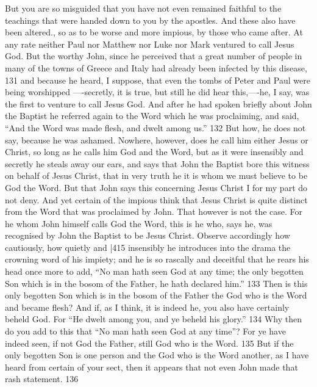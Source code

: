 But you are so misguided that you have not even remained faithful to the teachings that were handed down to you by the apostles. And these also have been altered., so as to be worse and more impious, by those who came after. At any rate neither Paul nor Matthew nor Luke nor Mark ventured to call Jesus God. But the worthy John, since he perceived that a great number of people in many of the towns of Greece and Italy had already been infected by this disease, 131 and because he heard, I suppose, that even the tombs of Peter and Paul were being worshipped
----secretly, it is true, but still he did hear this,----he, I say, was the first to venture to call Jesus God. And after he had spoken briefly about John the Baptist he referred again to the Word which he was proclaiming, and said, ``And the Word was made flesh, and dwelt among us.''
132 But how, he does not say, because he was ashamed. Nowhere, however, does he call him either Jesus or Christ, so long as he calls him God and the Word, but as it were insensibly and secretly he steals away our ears, and says that John the Baptist bore this witness on behalf of Jesus Christ, that in very truth he it is whom we must believe to be God the Word. But that John says this concerning Jesus Christ I for my part do not deny. And yet certain of the impious think that Jesus Christ is quite distinct from the Word that was proclaimed by John. That however is not the case. For he whom John himself calls God the Word, this is he who, says he, was recognised by John the Baptist to be Jesus Christ. Observe accordingly how cautiously, how quietly and
|415 insensibly he introduces into the drama the crowning word of his impiety; and he is so rascally and deceitful that he rears his head once more to add, ``No man hath seen God at any time; the only begotten Son which is in the bosom of the Father, he hath declared him.''
133 Then is this only begotten Son which is in the bosom of the Father the God who is the Word and became flesh? And if, as I think, it is indeed he, you also have certainly beheld God. For ``He dwelt among you, and ye beheld his glory.''
134 Why then do you add to this that ``No man hath seen God at any time''? For ye have indeed seen, if not God the Father, still God who is the Word. 135 But if the only begotten Son is one person and the God who is the Word another, as
I have heard from certain of your sect, then it appears that not even John made that rash statement. 136


